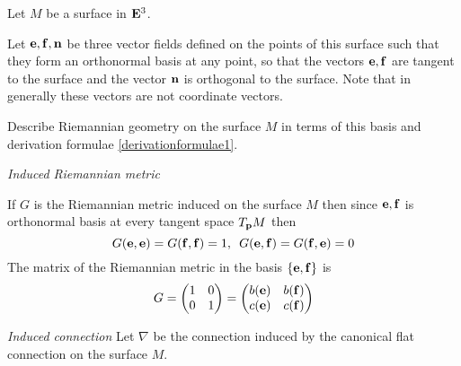 \documentclass[12pt]{article}
\theoremstyle{theorem}
\numberwithin{equation}{section}
\begin{document}
   Let $M$ be a surface in ${\bf E}^3$.

          Let ${{\bf e},{\bf f},{\bf n}}$ be three vector fields defined on the points of this surface
   such that they form an orthonormal basis at any point, so that the vectors ${\bf e},{\bf f}$ are tangent to the surface
   and  the vector ${\bf n}$ is orthogonal to the surface.
   Note that in generally these vectors are not coordinate vectors.

     Describe  Riemannian geometry on the surface
     $M$ in terms of this basis and derivation formulae \eqref{derivationformulae1}.




    \m



    {\it Induced Riemannian metric}

    If $G$ is the Riemannian metric induced on the surface $M$ then since ${\bf e},{\bf f}$ is orthonormal basis
    at every tangent space $T_{\bf p} M$ then
        \begin{equation}\label{inducriemmetricinnonholonombasis}
        G({\bf e},{\bf e})=G({\bf f},{\bf f})=1,\,\,\,G({\bf e},{\bf f})=G({\bf f},{\bf e})=0
        \end{equation}
       The matrix of the Riemannian metric in the basis $\{{\bf e},{\bf f}\}$ is
     \begin{equation}\label{inducedriemmetricinnonholonombasis2}
        G=
        \begin{pmatrix}
        1& 0\cr
        0& 1\cr
        \end{pmatrix}
        =
        \begin{pmatrix}
        b({\bf e})&  b({\bf f})\cr
        c({\bf e})& c({\bf f})\cr
        \end{pmatrix}
     \end{equation}


      \m


    {\it Induced connection}
    Let $\nabla$ be the connection induced by the canonical flat connection on the surface $M$.
\end{document}
